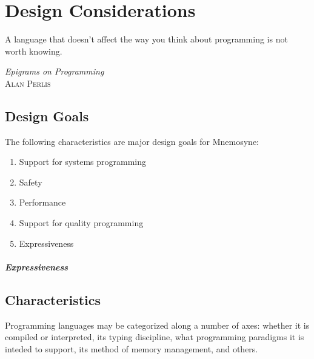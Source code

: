 %
%
%
\chapter{Design Considerations} \label{ch:design}

\epigraph{ A language that doesn't affect the way you think about programming
           is not worth knowing. }%
         { \textit{Epigrams on Programming}~\cite{Perlis:1982:SFE:947955.1083808} \\
          \textsc{Alan Perlis}}


\section{Design Goals} \label{sec:designgoals}

The following characteristics are major design goals for Mnemosyne:
\begin{enumerate}
    \item Support for systems programming
    \item Safety
    \item Performance
    \item Support for quality programming
    \item Expressiveness
\end{enumerate}

\paragraph{Expressiveness}
%

\section{Characteristics} \label{sec:characteristics}

Programming languages may be categorized along a number of axes: whether it is compiled or interpreted, its typing discipline, what programming paradigms it is inteded to support, its method of memory management, and others.

